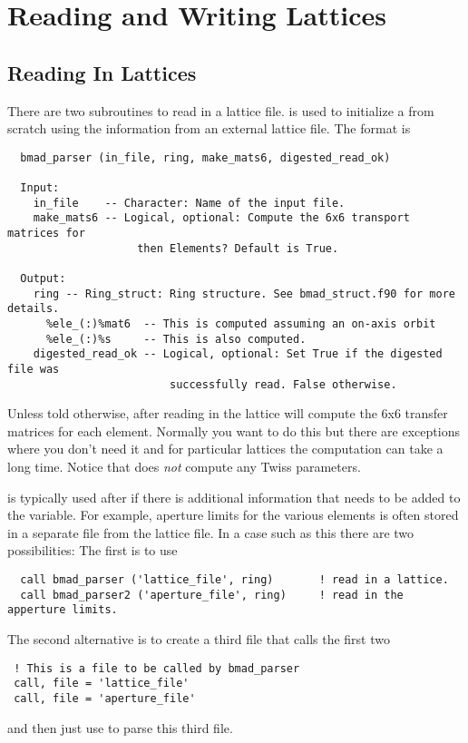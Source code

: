 \chapter{Reading and Writing Lattices}

\section{Reading In Lattices}

There are two subroutines to read in a lattice file. is
used to initialize a  from scratch using the information
from an external lattice file. The format is
\begin{verbatim}
  bmad_parser (in_file, ring, make_mats6, digested_read_ok) 

  Input:
    in_file    -- Character: Name of the input file.
    make_mats6 -- Logical, optional: Compute the 6x6 transport matrices for 
                    then Elements? Default is True.
 
  Output:
    ring -- Ring_struct: Ring structure. See bmad_struct.f90 for more details.
      %ele_(:)%mat6  -- This is computed assuming an on-axis orbit
      %ele_(:)%s     -- This is also computed.
    digested_read_ok -- Logical, optional: Set True if the digested file was
                         successfully read. False otherwise.
\end{verbatim}
Unless told otherwise, after reading in the lattice  will
compute the 6x6 transfer matrices for each element. Normally you want
to do this but there are exceptions where you don't need it and for
particular lattices the computation can take a long time. Notice that
 does {\em not} compute any Twiss parameters.

 is typically used after  if there is 
additional information that needs to be added to the 
variable.  For example, aperture limits for the various elements is often
stored in a separate file from the lattice file. In a case such as this
there are two possibilities: The first is to use  
\begin{verbatim}
  call bmad_parser ('lattice_file', ring)       ! read in a lattice.
  call bmad_parser2 ('aperture_file', ring)     ! read in the apperture limits.
\end{verbatim}
The second alternative is to create a third file that calls the first two
\begin{verbatim}
 ! This is a file to be called by bmad_parser
 call, file = 'lattice_file'
 call, file = 'aperture_file'
\end{verbatim}
and then just use  to parse this third file.


